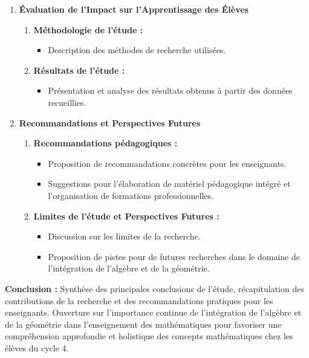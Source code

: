\begin{enumerate}
    \item \textbf{Évaluation de l'Impact sur l'Apprentissage des Élèves}
    \begin{enumerate}
        \item \textbf{Méthodologie de l'étude :}
        \begin{itemize}
            \item Description des méthodes de recherche utilisées.
        \end{itemize}
        
        \item \textbf{Résultats de l'étude :}
        \begin{itemize}
            \item Présentation et analyse des résultats obtenus à partir des données recueillies.
        \end{itemize}
    \end{enumerate}
    
    \item \textbf{Recommandations et Perspectives Futures}
    \begin{enumerate}
        \item \textbf{Recommandations pédagogiques :}
        \begin{itemize}
            \item Proposition de recommandations concrètes pour les enseignants.
            \item Suggestions pour l'élaboration de matériel pédagogique intégré et l'organisation de formations professionnelles.
        \end{itemize}
        
        \item \textbf{Limites de l'étude et Perspectives Futures :}
        \begin{itemize}
            \item Discussion sur les limites de la recherche.
            \item Proposition de pistes pour de futures recherches dans le domaine de l'intégration de l'algèbre et de la géométrie.
        \end{itemize}
    \end{enumerate}
\end{enumerate}

\textbf{Conclusion :} Synthèse des principales conclusions de l'étude, récapitulation des contributions de la recherche et des recommandations pratiques pour les enseignants. Ouverture sur l'importance continue de l'intégration de l'algèbre et de la géométrie dans l'enseignement des mathématiques pour favoriser une compréhension approfondie et holistique des concepts mathématiques chez les élèves du cycle 4.
